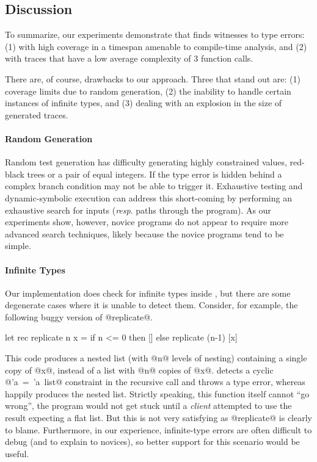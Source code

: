 \subsection{Discussion}
\label{sec:discussion}

To summarize, our experiments demonstrate that \nanomaly finds witnesses
to type errors: (1) with high coverage in a timespan amenable to
compile-time analysis, and (2) with traces that have a low average
complexity of 3 function calls.

There are, of course, drawbacks to our approach. Three that stand out
are: (1) coverage limits due to random generation, (2) the inability to
handle certain instances of infinite types, and (3) dealing with an
explosion in the size of generated traces.

\paragraph{Random Generation}
Random test generation has difficulty generating highly constrained
values, \eg red-black trees or a pair of equal integers. If the type
error is hidden behind a complex branch condition \nanomaly may not be
able to trigger it. Exhaustive testing and dynamic-symbolic execution
can address this short-coming by performing an exhaustive search for
inputs (\emph{resp}. paths through the program). As our experiments
show, however, novice programs do not appear to require more advanced
search techniques, likely because the novice programs tend to be simple.

\paragraph{Infinite Types}
Our implementation does check for infinite types inside \forcesym, but
there are some degenerate cases where it is unable to detect
them. Consider, for example, the following buggy version of @replicate@.
%
\begin{code}
  let rec replicate n x =
    if n <= 0 then
      []
    else
      replicate (n-1) [x]
\end{code}
%
This code produces a nested list (with @n@ levels of nesting) containing
a single copy of @x@, instead of a list with @n@ copies of @x@. \ocaml
detects a cyclic \hbox{@'a = 'a list@} constraint in the recursive call
and throws a type error, whereas \nanomaly happily %
produces the nested list.  Strictly speaking, this function itself cannot
``go wrong'', the program would not get stuck until a \emph{client}
attempted to use the result expecting a flat list. But this is not very
satisfying as @replicate@ is clearly to blame. Furthermore, in our
experience, infinite-type errors are often difficult to %
debug (and to explain to novices), so better support for this scenario
would be useful.

